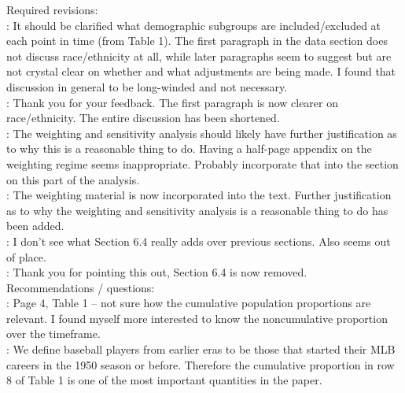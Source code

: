 \documentclass[11pt]{article}
\begin{document}
Required revisions: \\

:
It should be clarified what demographic subgroups are included/excluded at 
each point in time (from Table 1).  The first paragraph in the data section 
does not discuss race/ethnicity at all, while later paragraphs seem to suggest 
but are not crystal clear on whether and what adjustments are being made.  
I found that discussion in general to be long-winded and not necessary. \\

: Thank you for your feedback.  The first paragraph is 
now clearer on race/ethnicity.  The entire discussion has been shortened.  \\



:
The weighting and sensitivity analysis should likely have further 
justification as to why this is a reasonable thing to do.  Having a 
half-page appendix on the weighting regime seems inappropriate.  Probably 
incorporate that into the section on this part of the analysis. \\

: The weighting material is now incorporated into the 
text.  Further justification as to why the weighting and sensitivity 
analysis is a reasonable thing to do has been added. \\



: I don’t see what Section 6.4 really adds over 
previous sections.  Also seems out of place. \\

: Thank you for pointing this out, Section 6.4 
is now removed. \\



Recommendations / questions: \\

:
Page 4, Table 1 -- not sure how the cumulative population proportions are 
relevant.  I found myself more interested to know the noncumulative proportion 
over the timeframe. \\

: We define baseball players from earlier eras to be 
those that started their MLB careers in the 1950 season or before.  
Therefore the cumulative proportion in row 8 of Table 1 is one of the most 
important quantities in the paper. \\
\end{document}
